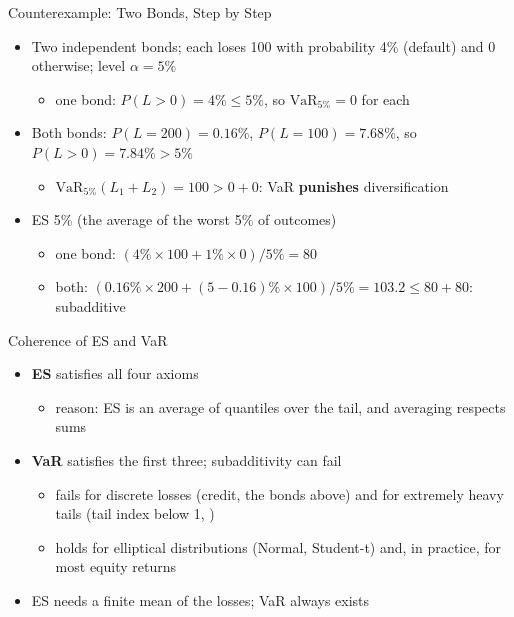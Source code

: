\begin{frame}{Counterexample: Two Bonds, Step by Step}
\itemsize{\footnotesize}
\begin{itemize}
    \item Two independent bonds; each loses 100 with probability 4\% (default) and 0 otherwise; level $\alpha = 5\%$
    \begin{itemize}
        \item one bond: $P(L > 0) = 4\% \le 5\%$, so $\mathrm{VaR}_{5\%} = 0$ for each
    \end{itemize}
    \item Both bonds: $P(L = 200) = 0.16\%$, $P(L = 100) = 7.68\%$, so $P(L > 0) = 7.84\% > 5\%$
    \begin{itemize}
        \item $\mathrm{VaR}_{5\%}(L_1 + L_2) = 100 > 0 + 0$: VaR \textbf{punishes} diversification
    \end{itemize}
    \item ES 5\% (the average of the worst 5\% of outcomes)
    \begin{itemize}
        \item one bond: $(4\% \times 100 + 1\% \times 0)/5\% = 80$
        \item both: $(0.16\% \times 200 + (5 - 0.16)\% \times 100)/5\% = 103.2 \le 80 + 80$: subadditive
    \end{itemize}
\end{itemize}
\end{frame}

\begin{frame}{Coherence of ES and VaR}
\itemsize{\small}
\begin{itemize}
    \item \textbf{ES} satisfies all four axioms 
    \begin{itemize}
        \item reason: ES is an average of quantiles over the tail, and averaging respects sums
    \end{itemize}
    \item \textbf{VaR} satisfies the first three; subadditivity can fail
    \begin{itemize}
        \item fails for discrete losses (credit, the bonds above) and for extremely heavy tails (tail index below 1, )
        \item holds for elliptical distributions (Normal, Student-t) and, in practice, for most equity returns 
    \end{itemize}
    \item ES needs a finite mean of the losses; VaR always exists
\end{itemize}
\end{frame}

